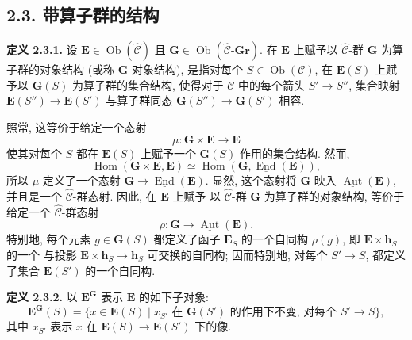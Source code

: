 
\subsection*{2.3. 带算子群的结构}

\medskip
\noindent{}\textbf{定义 2.3.1.}
设 \(\mathbf E\in\operatorname{Ob}(\widehat{\mathscr C})\) 且
\(\mathbf G\in
\operatorname{Ob}(\widehat{\mathscr C}\text{-}\mathbf{Gr})\).
在 \(\mathbf E\) 上赋予以 \(\widehat{\mathscr C}\)-群 \(\mathbf G\)
为算子群的对象结构 (或称 \(\mathbf G\)-对象结构), 是指对每个
\(S\in\operatorname{Ob}(\mathscr C)\), 在 \(\mathbf E(S)\) 上赋予以
\(\mathbf G(S)\) 为算子群的集合结构, 使得对于 \(\mathscr C\) 中的每个箭头
\(S'\to S''\), 集合映射
\(\mathbf E(S'')\to\mathbf E(S')\) 与算子群同态
\(\mathbf G(S'')\to\mathbf G(S')\) 相容.

照常, 这等价于给定一个态射
\[
  \mu:\mathbf G\times\mathbf E\longrightarrow\mathbf E
\]
使其对每个 \(S\) 都在 \(\mathbf E(S)\) 上赋予一个
\(\mathbf G(S)\) 作用的集合结构. 然而,
\[
  \operatorname{Hom}(\mathbf G\times\mathbf E,\mathbf E)
    \simeq
  \operatorname{Hom}
    (\mathbf G,\underline{\operatorname{End}}(\mathbf E)),
\]
所以 \(\mu\) 定义了一个态射
\(\mathbf G\to\underline{\operatorname{End}}(\mathbf E)\). 显然, 这个态射将
\(\mathbf G\) 映入 \(\underline{\operatorname{Aut}}(\mathbf E)\),
并且是一个 \(\widehat{\mathscr C}\)-群态射. 因此, 在 \(\mathbf E\) 上赋予
以 \(\widehat{\mathscr C}\)-群 \(\mathbf G\) 为算子群的对象结构,
等价于给定一个 \(\widehat{\mathscr C}\)-群态射
\[
  \rho:\mathbf G\longrightarrow
    \underline{\operatorname{Aut}}(\mathbf E).
\]
特别地, 每个元素 \(g\in\mathbf G(S)\) 都定义了函子 \(\mathbf E_S\)
的一个自同构 \(\rho(g)\), 即 \(\mathbf E\times\mathbf h_S\) 的一个
与投影 \(\mathbf E\times\mathbf h_S\to\mathbf h_S\) 可交换的自同构;
因而特别地, 对每个 \(S'\to S\), 都定义了集合 \(\mathbf E(S')\)
的一个自同构.

\medskip
\noindent{}\textbf{定义 2.3.2.}
以 \(\mathbf E^{\mathbf G}\) 表示 \(\mathbf E\) 的如下子对象:
\[
  \mathbf E^{\mathbf G}(S)
    =\bigl\{x\in\mathbf E(S)\mid
      x_{S'}\text{ 在 }\mathbf G(S')
      \text{ 的作用下不变, 对每个 }S'\to S\bigr\},
\]
其中 \(x_{S'}\) 表示 \(x\) 在
\(\mathbf E(S)\to\mathbf E(S')\) 下的像.

